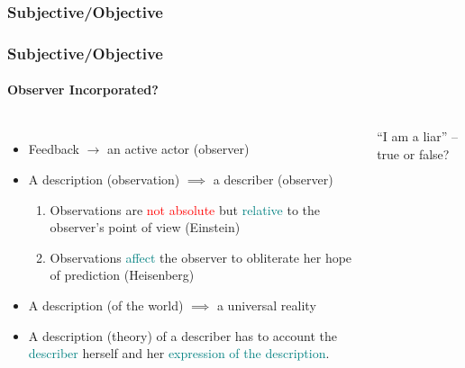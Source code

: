 \documentclass[
	11pt,
	aspectratio=169,
]{beamer}
\begin{document}
            \subsubsection{Subjective/Objective}
                \begin{frame}
                    \frametitle{Subjective/Objective}
                    \framesubtitle{Observer Incorporated?}
                    \begin{columns}
                            \begin{itemize}
                                \item<1-> Feedback $\longrightarrow$ an active actor (observer)
                                \item<2-> A description (observation) $\implies$ a describer (observer)
                                    \begin{enumerate}
                                        \item Observations are \textcolor{red}{not absolute} but \textcolor{teal}{relative} to the observer's point of view (Einstein)
                                        \item Observations \textcolor{teal}{affect} the observer to obliterate her hope of prediction (Heisenberg)
                                    \end{enumerate}
                                \item<3-> A description (of the world) $\implies$ a universal reality
                                \item<4-> A description (theory) of a describer has to account the \textcolor{teal}{describer} herself and her \textcolor{teal}{expression of the description}.
                            \end{itemize}
                            ``I am a liar'' -- true or false? \\

\end{columns}
\end{frame}
\end{document}
